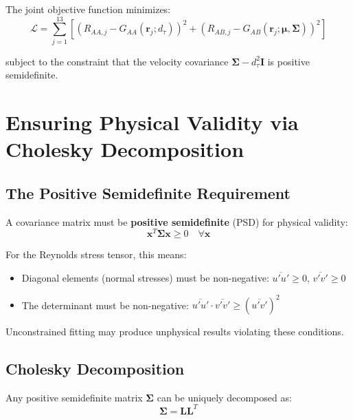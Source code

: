 \documentclass[11pt,a4paper]{article}
\begin{document}
The joint objective function minimizes:
\begin{equation}
    \mathcal{L} = \sum_{j=1}^{13} \left[ \left( R_{AA,j} - G_{AA}(\mathbf{r}_j; d_\tau) \right)^2 + \left( R_{AB,j} - G_{AB}(\mathbf{r}_j; \boldsymbol{\mu}, \boldsymbol{\Sigma}) \right)^2 \right]
\end{equation}

subject to the constraint that the velocity covariance $\boldsymbol{\Sigma} - d_\tau^2 \mathbf{I}$ is positive semidefinite.

\section{Ensuring Physical Validity via Cholesky Decomposition}

\subsection{The Positive Semidefinite Requirement}

A covariance matrix must be \textbf{positive semidefinite} (PSD) for physical validity:
\begin{equation}
    \mathbf{x}^T \boldsymbol{\Sigma} \mathbf{x} \geq 0 \quad \forall \mathbf{x}
\end{equation}

For the Reynolds stress tensor, this means:
\begin{itemize}
    \item Diagonal elements (normal stresses) must be non-negative: $\overline{u'u'} \geq 0$, $\overline{v'v'} \geq 0$
    \item The determinant must be non-negative: $\overline{u'u'} \cdot \overline{v'v'} \geq (\overline{u'v'})^2$
\end{itemize}

Unconstrained fitting may produce unphysical results violating these conditions.

\subsection{Cholesky Decomposition}

Any positive semidefinite matrix $\boldsymbol{\Sigma}$ can be uniquely decomposed as:
\begin{equation}
    \boldsymbol{\Sigma} = \mathbf{L} \mathbf{L}^T
\end{equation}
\end{document}
